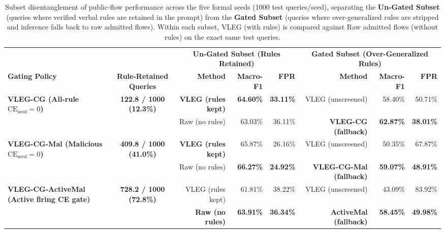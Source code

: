 \documentclass[10pt,a4paper,onecolumn]{article}
\theoremstyle{definition}
\theoremstyle{remark}
\begin{document}
\begin{table}[!t]
\centering
\caption{Subset disentanglement of public-flow performance across the five formal seeds (1000 test queries/seed), separating the \textbf{Un-Gated Subset} (queries where verified verbal rules are retained in the prompt) from the \textbf{Gated Subset} (queries where over-generalized rules are stripped and inference falls back to raw admitted flows). Within each subset, VLEG (with rules) is compared against Raw admitted flows (without rules) on the exact same test queries.}
\label{tab:subset_analysis}
\small
\begin{adjustbox}{max width=\linewidth}
\begin{tabular}{lcrrrrrr}
\toprule
 & & \multicolumn{3}{c}{\textbf{Un-Gated Subset (Rules Retained)}} & \multicolumn{3}{c}{\textbf{Gated Subset (Over-Generalized Rules)}} \\
\cmidrule(lr){3-5}\cmidrule(lr){6-8}
\textbf{Gating Policy} & \textbf{Rule-Retained Queries} & \textbf{Method} & \textbf{Macro-F1} & \textbf{FPR} & \textbf{Method} & \textbf{Macro-F1} & \textbf{FPR} \\
\midrule
\multirow{2}{*}{\textbf{VLEG-CG (All-rule $\mathrm{CE}_{\mathrm{seed}}{=}0$)}} & \multirow{2}{*}{\textbf{122.8 / 1000 (12.3\%)}}
 & \textbf{VLEG (rules kept)} & \textbf{64.60\%} & \textbf{33.11\%} & VLEG (unscreened) & 58.40\% & 50.71\% \\
 & & Raw (no rules) & 63.03\% & 36.11\% & \textbf{VLEG-CG (fallback)} & \textbf{62.87\%} & \textbf{38.01\%} \\
\midrule
\multirow{2}{*}{\textbf{VLEG-CG-Mal (Malicious $\mathrm{CE}_{\mathrm{seed}}{=}0$)}} & \multirow{2}{*}{\textbf{409.8 / 1000 (41.0\%)}}
 & \textbf{VLEG (rules kept)} & 65.87\% & 26.16\% & VLEG (unscreened) & 50.35\% & 67.87\% \\
 & & Raw (no rules) & \textbf{66.27\%} & \textbf{24.92\%} & \textbf{VLEG-CG-Mal (fallback)} & \textbf{59.07\%} & \textbf{48.91\%} \\
\midrule
\multirow{2}{*}{\textbf{VLEG-CG-ActiveMal (Active firing CE gate)}} & \multirow{2}{*}{\textbf{728.2 / 1000 (72.8\%)}}
 & VLEG (rules kept) & 61.81\% & 38.22\% & VLEG (unscreened) & 43.09\% & 83.92\% \\
 & & \textbf{Raw (no rules)} & \textbf{63.91\%} & \textbf{36.34\%} & \textbf{ActiveMal (fallback)} & \textbf{58.45\%} & \textbf{49.98\%} \\
\bottomrule
\end{tabular}
\end{adjustbox}
\end{table}
\end{document}
